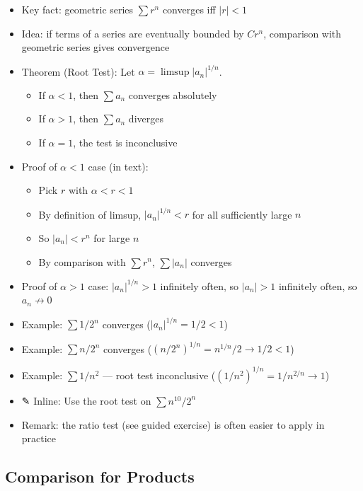 \documentclass[
  10pt,
  letterpaper,
]{scrbook}
\providecommand{\tightlist}{%
  \setlength{\itemsep}{0pt}\setlength{\parskip}{0pt}}
\begin{document}
\begin{itemize}
\tightlist
\item
  Key fact: geometric series \(\sum r^n\) converges iff \(|r| < 1\)
\item
  Idea: if terms of a series are eventually bounded by \(Cr^n\),
  comparison with geometric series gives convergence
\item
  Theorem (Root Test): Let \(\alpha = \limsup |a_n|^{1/n}\).

  \begin{itemize}
  \tightlist
  \item
    If \(\alpha < 1\), then \(\sum a_n\) converges absolutely
  \item
    If \(\alpha > 1\), then \(\sum a_n\) diverges
  \item
    If \(\alpha = 1\), the test is inconclusive
  \end{itemize}
\item
  Proof of \(\alpha < 1\) case (in text):

  \begin{itemize}
  \tightlist
  \item
    Pick \(r\) with \(\alpha < r < 1\)
  \item
    By definition of limsup, \(|a_n|^{1/n} < r\) for all sufficiently
    large \(n\)
  \item
    So \(|a_n| < r^n\) for large \(n\)
  \item
    By comparison with \(\sum r^n\), \(\sum |a_n|\) converges
  \end{itemize}
\item
  Proof of \(\alpha > 1\) case: \(|a_n|^{1/n} > 1\) infinitely often, so
  \(|a_n| > 1\) infinitely often, so \(a_n \not\to 0\)
\item
  Example: \(\sum 1/2^n\) converges (\(|a_n|^{1/n} = 1/2 < 1\))
\item
  Example: \(\sum n/2^n\) converges
  (\((n/2^n)^{1/n} = n^{1/n}/2 \to 1/2 < 1\))
\item
  Example: \(\sum 1/n^2\) --- root test inconclusive
  (\((1/n^2)^{1/n} = 1/n^{2/n} \to 1\))
\item
  ✎ Inline: Use the root test on \(\sum n^{10}/2^n\)
\item
  Remark: the ratio test (see guided exercise) is often easier to apply
  in practice
\end{itemize}

\subsection{Comparison for Products}\label{comparison-for-products}
\end{document}
